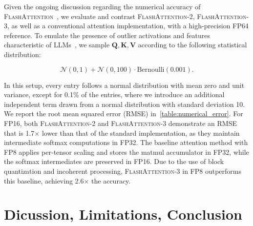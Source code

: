 \begin{algorithm}[H]
\begin{algorithmic}[1]
\begin{enumerate}
Given the ongoing discussion regarding the numerical accuracy of \textsc{FlashAttention}~\citep{golden2024flash}, we evaluate and contrast \textsc{FlashAttention-2}, \textsc{FlashAttention-3}, as well as a conventional attention implementation, with a high-precision FP64 reference. To emulate the presence of outlier activations and features characteristic of LLMs~\citep{dettmers2208llm, sun2024massive}, we sample $\mathbf{Q}, \mathbf{K}, \mathbf{V}$ according to the following statistical distribution:

\begin{equation*}
  \mathcal{N}(0, 1) + \mathcal{N}(0, 100) \cdot \mathrm{Bernoulli}(0.001).
\end{equation*}

In this setup, every entry follows a normal distribution with mean zero and unit variance, except for 0.1\% of the entries, where we introduce an additional independent term drawn from a normal distribution with standard deviation 10. We report the root mean squared error (RMSE) in~\cref{table:numerical_error}. For FP16, both \textsc{FlashAttention-2} and \textsc{FlashAttention-3} demonstrate an RMSE that is 1.7$\times$ lower than that of the standard implementation, as they maintain intermediate softmax computations in FP32. The baseline attention method with FP8 applies per-tensor scaling and stores the matmul accumulator in FP32, while the softmax intermediates are preserved in FP16. Due to the use of block quantization and incoherent processing, \textsc{FlashAttention-3} in FP8 outperforms this baseline, achieving 2.6$\times$ the accuracy.

\section{Dicussion, Limitations, Conclusion}
\label{sec:discussion}


\end{enumerate}
\end{algorithmic}
\end{algorithm}
